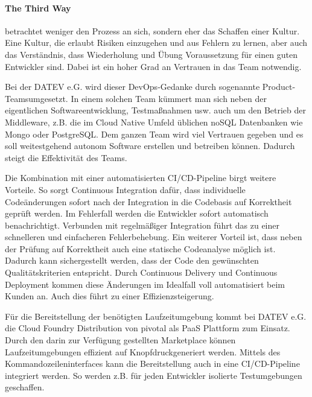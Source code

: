 \paragraph{\glqq The Third Way\grqq} betrachtet weniger den Prozess an sich, sondern eher das Schaffen einer Kultur.
Eine Kultur, die erlaubt Risiken einzugehen und aus Fehlern zu lernen, aber auch das Verständnis, dass Wiederholung und Übung Voraussetzung für einen guten Entwickler sind.
Dabei ist ein hoher Grad an Vertrauen in das Team notwendig.

Bei der DATEV e.G. wird dieser DevOps-Gedanke durch sogenannte \glqq Product-Teams\grqq umgesetzt.
In einem solchen Team kümmert man sich neben der eigentlichen Softwareentwicklung, Testmaßnahmen usw. auch um den Betrieb der Middleware, z.B. die im Cloud Native Umfeld üblichen noSQL Datenbanken wie Mongo oder PostgreSQL. 
Dem ganzen Team wird viel Vertrauen gegeben und es soll weitestgehend autonom Software erstellen und betreiben können.
Dadurch steigt die Effektivität des Teams.

Die Kombination mit einer automatisierten CI/CD-Pipeline birgt weitere Vorteile.
So sorgt Continuous Integration dafür, dass individuelle Codeänderungen sofort nach der Integration in die Codebasis auf Korrektheit geprüft werden.
Im Fehlerfall werden die Entwickler sofort automatisch benachrichtigt. 
Verbunden mit regelmäßiger Integration führt das zu einer schnelleren und einfacheren Fehlerbehebung.
Ein weiterer Vorteil ist, dass neben der Prüfung auf Korrektheit auch eine statische Codeanalyse möglich ist.
Dadurch kann sichergestellt werden, dass der Code den gewünschten Qualitätskriterien entspricht.
Durch Continuous Delivery und Continuous Deployment kommen diese Änderungen im Idealfall voll automatisiert beim Kunden an.
Auch dies führt  zu einer Effizienzsteigerung.

Für die Bereitstellung der benötigten Laufzeitumgebung kommt bei DATEV e.G. die Cloud Foundry Distribution von \glqq pivotal\grqq{} als PaaS Plattform zum Einsatz.
Durch den darin zur Verfügung gestellten \glqq Marketplace\grqq{} können Laufzeitumgebungen effizient \glqq auf Knopfdruck\grqq generiert werden.
Mittels des Kommandozeileninterfaces kann die Bereitstellung auch in eine CI/CD-Pipeline integriert werden.
So werden z.B. für jeden Entwickler isolierte Testumgebungen geschaffen.


